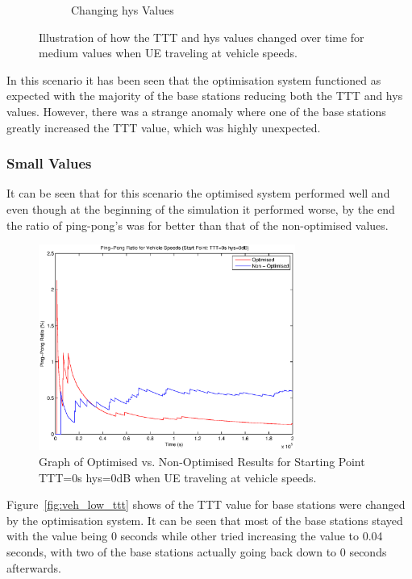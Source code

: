 \begin{figure}[H]
\begin{subfigure}[b]{0.49\textwidth}
                \caption{Changing hys Values}
                \label{fig:veh_mid_hys}
        \end{subfigure}
        \caption{Illustration of how the TTT and hys values changed over time for medium values when UE traveling at vehicle speeds.}\label{fig:veh_mid_ttthys}
\end{figure}
In this scenario it has been seen that the optimisation system functioned as expected with the majority of the base stations reducing both the TTT and hys values. However, there was a strange anomaly where one of the base stations greatly increased the TTT value, which was highly unexpected. 
\subsubsection*{Small Values}
It can be seen that for this scenario the optimised system performed well and even though at the beginning of the simulation it performed worse, by the end the ratio of ping-pong's was for better than that of the non-optimised values.
\begin{figure}[H]
  \begin{center}
    	  \includegraphics[width=0.75\textwidth]{figures/vehicle_figures/low/long_ping.eps}
    \end{center}
    \caption{Graph of Optimised vs. Non-Optimised Results for Starting Point TTT=0s hys=0dB when UE traveling at vehicle speeds.}
    \label{fig:veh_low_drop}
\end{figure}
Figure~\ref{fig:veh_low_ttt} shows of the TTT value for base stations were changed by the optimisation system. It can be seen that most of the base stations stayed with the value being 0 seconds while other tried increasing the value to 0.04 seconds, with two of the base stations actually going back down to 0 seconds afterwards.

